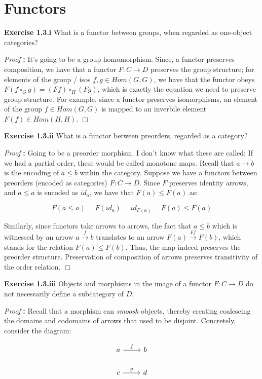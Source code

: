 \documentclass[11pt]{book}
\def\qed{$\Box$}
\newcommand{\beginproof}[1][]{\emph{Proof #1}\textbf{:} }
\newcommand{\question}[1]{\textbf{#1}}
\begin{document}
\section{Functors}

\question{Exercise 1.3.i}  What is a functor between groups, when regarded as one-object categories?


\beginproof It's going to be a group homomorphism. Since, a functor preserves composition, we have that a
functor $F: C \rightarrow D$ preserves the group structure; for elements of the group / isos $f, g \in Hom(G, G)$, 
we have that the functor obeys $F(f \circ_G g) = (F f) \circ_H (F g)$, which is exactly the equation
we need to preserve group structure. For example, since a functor preserves isomorphisms, an element of the group $f \in Hom(G, G)$
is mapped to an inverbile element $F(f) \in Hom(H, H)$. \qed


\question{Exercise 1.3.ii}  What is a functor between preorders, regarded as a category?

\beginproof Going to be a preorder morphism. I don't know what these are called; If we had a partial order, these
would be called monotone maps. Recall that $a \rightarrow b$ is the encoding of $a \leq b$  within the category.
Suppose we have a functors between preorders (encoded as categories) $F: C \rightarrow D$. Since $F$ preserves
identity arrows, and $a \leq a$ is encoded as $id_a$, we have that $F(a) \leq F(a)$ as:

$$F(a \leq a) = F(id_a) = id_{F(a)} = F(a) \leq F(a)$$


Similarly, since functors take arrows to arrows, the fact that $a \leq b$ which is witnessed by an arrow $a \xrightarrow{f} b$
translates to an arrow $F(a) \xrightarrow{F f} F(b)$, which stands for the relation $F(a) \leq F(b)$. Thus, the map indeed
preserves the preorder structure. Preservation of composition of arrows preserves transitivity of the order relation. \qed


\question{Exercise 1.3.iii} Objects and morphisms in the image of a functor $F: C \rightarrow D$ do not necessarily define a subcategory of $D$.

\beginproof Recall that a morphism can \emph{smoosh} objects, thereby creating coalescing the domains and codomains
of arrows that used to be disjoint. Concretely, consider the diagram:

\[\begin{tikzcd}
	a & b \\
	c & d
	\arrow["g", from=2-1, to=2-2]
	\arrow["f", from=1-1, to=1-2]
\end{tikzcd}\]
\end{document}
